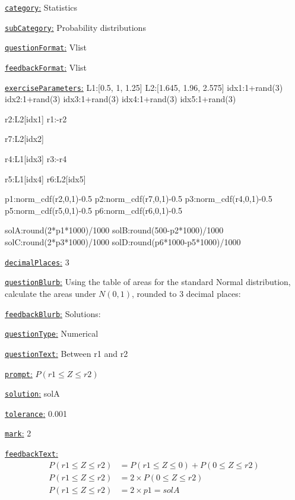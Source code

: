 \documentclass[preview]{standalone}
\newcommand \fieldname[1]{\underline{\texttt{#1}:}}
\begin{document}
\fieldname{category}  %
Statistics

\fieldname{subCategory} %
Probability distributions

\fieldname{questionFormat}
Vlist

\fieldname{feedbackFormat}
Vlist

\fieldname{exerciseParameters}
L1:[0.5, 1, 1.25]
L2:[1.645, 1.96, 2.575]
idx1:1+rand(3)
idx2:1+rand(3)
idx3:1+rand(3)
idx4:1+rand(3)
idx5:1+rand(3)

r2:L2[idx1]
r1:-r2

r7:L2[idx2]

r4:L1[idx3]
r3:-r4

r5:L1[idx4]
r6:L2[idx5]

p1:norm_cdf(r2,0,1)-0.5
p2:norm_cdf(r7,0,1)-0.5
p3:norm_cdf(r4,0,1)-0.5
p5:norm_cdf(r5,0,1)-0.5
p6:norm_cdf(r6,0,1)-0.5

solA:round(2*p1*1000)/1000
solB:round(500-p2*1000)/1000
solC:round(2*p3*1000)/1000
solD:round(p6*1000-p5*1000)/1000

\fieldname{decimalPlaces}
3

\fieldname{questionBlurb}
Using the table of areas for the standard Normal distribution, calculate the areas under $N(0,1)$, rounded to 3 decimal places:

\fieldname{feedbackBlurb}
Solutions:

\fieldname{questionType}
Numerical

\fieldname{questionText}
Between {r1} and {r2}

\fieldname{prompt}
$P({r1} \le Z \le {r2})$

\fieldname{solution}
solA

\fieldname{tolerance}
0.001

\fieldname{mark}
2

\fieldname{feedbackText}
\[
\begin{aligned}
P({r1} \le Z \le {r2}) & = P({r1} \le Z \le 0 ) + P( 0 \le Z \le {r2})\\
P({r1} \le Z \le {r2}) & = 2 \times P( 0 \le Z \le {r2})\\
P({r1} \le Z \le {r2}) & = 2 \times {p1} = {solA}\\
\end{aligned}
\]
\end{document}
